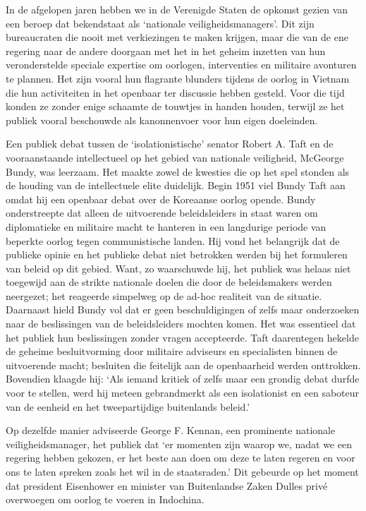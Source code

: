 \documentclass[
  a5paper,
  smalldemyvopaper,10pt,twoside,onecolumn,openright,extrafontsizes,hidelinks]{memoir}
\begin{document}
In de afgelopen jaren hebben we in de Verenigde Staten de opkomst gezien
van een beroep dat bekendstaat als `nationale veiligheidsmanagers'. Dit
zijn bureaucraten die nooit met verkiezingen te maken krijgen, maar die
van de ene regering naar de andere doorgaan met het in het geheim
inzetten van hun veronderstelde speciale expertise om oorlogen,
interventies en militaire avonturen te plannen. Het zijn vooral hun
flagrante blunders tijdens de oorlog in Vietnam die hun activiteiten in
het openbaar ter discussie hebben gesteld. Voor die tijd konden ze
zonder enige schaamte de touwtjes in handen houden, terwijl ze het
publiek vooral beschouwde als kanonnenvoer voor hun eigen doeleinden.

Een publiek debat tussen de `isolationistische' senator Robert A. Taft
en de vooraanstaande intellectueel op het gebied van nationale
veiligheid, McGeorge Bundy, was leerzaam. Het maakte zowel de kwesties
die op het spel stonden als de houding van de intellectuele elite
duidelijk. Begin 1951 viel Bundy Taft aan omdat hij een openbaar debat
over de Koreaanse oorlog opende. Bundy onderstreepte dat alleen de
uitvoerende beleidsleiders in staat waren om diplomatieke en militaire
macht te hanteren in een langdurige periode van beperkte oorlog tegen
communistische landen. Hij vond het belangrijk dat de publieke opinie en
het publieke debat niet betrokken werden bij het formuleren van beleid
op dit gebied. Want, zo waarschuwde hij, het publiek was helaas niet
toegewijd aan de strikte nationale doelen die door de beleidsmakers
werden neergezet; het reageerde simpelweg op de ad-hoc realiteit van de
situatie. Daarnaast hield Bundy vol dat er geen beschuldigingen of zelfs
maar onderzoeken naar de beslissingen van de beleidsleiders mochten
komen. Het was essentieel dat het publiek hun beslissingen zonder vragen
accepteerde. Taft daarentegen hekelde de geheime besluitvorming door
militaire adviseurs en specialisten binnen de uitvoerende macht;
besluiten die feitelijk aan de openbaarheid werden onttrokken. Bovendien
klaagde hij: `Als iemand kritiek of zelfs maar een grondig debat durfde
voor te stellen, werd hij meteen gebrandmerkt als een isolationist en
een saboteur van de eenheid en het tweepartijdige buitenlands beleid.'

Op dezelfde manier adviseerde George F. Kennan, een prominente nationale
veiligheidsmanager, het publiek dat `er momenten zijn waarop we, nadat
we een regering hebben gekozen, er het beste aan doen om deze te laten
regeren en voor ons te laten spreken zoals het wil in de staatsraden.'
Dit gebeurde op het moment dat president Eisenhower en minister van
Buitenlandse Zaken Dulles privé overwoegen om oorlog te voeren in
Indochina.
\end{document}
